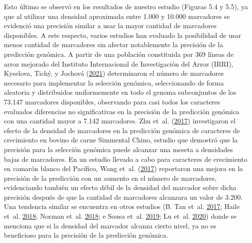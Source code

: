 \documentclass[11pt,spanish,a4paper,oneside,]{book} %
\begin{document}
Esto último se observó en los resultados de nuestro estudio (Figuras 5.4 y 5.5), ya que al utilizar una densidad aproximada entre 1.000 y 10.000 marcadores se evidenció una precisión similar a usar la mayor cantidad de marcadores disponibles. A este respecto, varios estudios han evaluado la posibilidad de usar menos cantidad de marcadores sin afectar notablemente la precisión de la predicción genómica. A partir de una población constituida por 369 líneas de arroz mejorado del Instituto Internacional de Investigación del Arroz (IRRI), Kyselova, Tichý, y Jochová (\protect\hyperlink{ref-cite:32}{2021}) determinaron el número de marcadores necesario para implementar la selección genómica, seleccionando de forma aleatoria y distribuidos uniformemente en todo el genoma subconjuntos de los 73.147 marcadores disponibles, observando para casi todos los caracteres evaluados diferencias no significativas en la precisión de la predicción genómica con una cantidad mayor a 7.142 marcadores. Zhu et~al. (\protect\hyperlink{ref-cite:83}{2017}) investigaron el efecto de la densidad de marcadores en la predicción genómica de caracteres de crecimiento en bovino de carne Simmental Chino, estudio que demostró que la precisión para la selección genómica puede alcanzar una meseta a densidades bajas de marcadores. En un estudio llevado a cabo para caracteres de crecimiento en camarón blanco del Pacífico, Wang et~al. (\protect\hyperlink{ref-cite:82}{2017}) reportaron una mejora en la precisión de la predicción con un aumento en el número de marcadores, evidenciando también un efecto débil de la densidad del marcador sobre dicha precisión después de que la cantidad de marcadores alcanzara un valor de 3.200. Una tendencia similar se encuentra en otros estudios (B. Tan et~al. \protect\hyperlink{ref-cite:79}{2017}; Haile et~al. \protect\hyperlink{ref-cite:81}{2018}; Norman et~al. \protect\hyperlink{ref-cite:78}{2018}; e Sousa et~al. \protect\hyperlink{ref-cite:84}{2019}; Lu et~al. \protect\hyperlink{ref-cite:80}{2020}) donde se menciona que si la densidad del marcador alcanza cierto nivel, ya no es beneficioso para la precisión de la predicción genómica.
\end{document}

